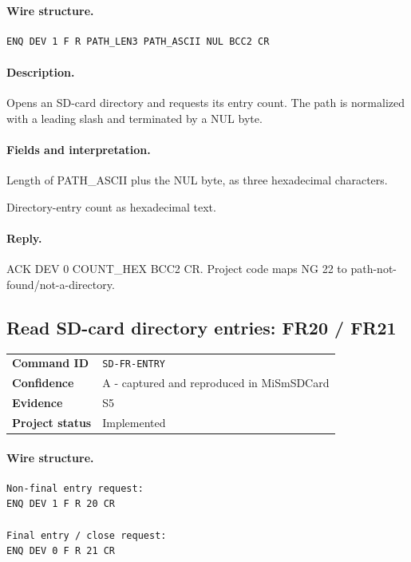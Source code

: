 \documentclass[10pt,letterpaper]{article}
\begin{document}
\paragraph{Wire structure.}
\begin{Verbatim}[breaklines=true,breakanywhere=true,fontsize=\small]
ENQ DEV 1 F R PATH_LEN3 PATH_ASCII NUL BCC2 CR
\end{Verbatim}
\paragraph{Description.} Opens an SD-card directory and requests its entry count. The path is normalized with a leading slash and terminated by a NUL byte.
\paragraph{Fields and interpretation.}
\begin{description}[style=nextline,leftmargin=3.2cm,labelwidth=3.0cm,font=\normalfont\bfseries]
\item[PATH\_LEN3] Length of PATH\_ASCII plus the NUL byte, as three hexadecimal characters.
\item[Reply data] Directory-entry count as hexadecimal text.
\end{description}
\paragraph{Reply.} ACK DEV 0 COUNT\_HEX BCC2 CR. Project code maps NG 22 to path-not-found/not-a-directory.

\subsection{Read SD-card directory entries: FR20 / FR21}
\begin{tabularx}{\textwidth}{@{}>{\bfseries}p{2.8cm}X@{}}
Command ID & \texttt{SD-FR-ENTRY} \\
Confidence & A - captured and reproduced in MiSmSDCard \\
Evidence & S5 \\
Project status & Implemented \\
\end{tabularx}
\vspace{0.35em}
\paragraph{Wire structure.}
\begin{Verbatim}[breaklines=true,breakanywhere=true,fontsize=\small]
Non-final entry request:
ENQ DEV 1 F R 20 CR

Final entry / close request:
ENQ DEV 0 F R 21 CR
\end{Verbatim}
\end{document}
